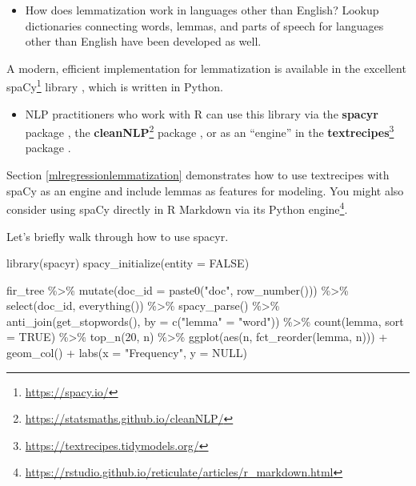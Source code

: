 \documentclass[
]{krantz}
\makeatletter
\newenvironment{Shaded}{\begin{snugshade}}{\end{snugshade}}
\newcommand{\AttributeTok}[1]{\textcolor[rgb]{0.77,0.63,0.00}{#1}}
\newcommand{\ConstantTok}[1]{\textcolor[rgb]{0.00,0.00,0.00}{#1}}
\newcommand{\DecValTok}[1]{\textcolor[rgb]{0.00,0.00,0.81}{#1}}
\newcommand{\FunctionTok}[1]{\textcolor[rgb]{0.00,0.00,0.00}{#1}}
\newcommand{\NormalTok}[1]{#1}
\newcommand{\OtherTok}[1]{\textcolor[rgb]{0.56,0.35,0.01}{#1}}
\newcommand{\SpecialCharTok}[1]{\textcolor[rgb]{0.00,0.00,0.00}{#1}}
\newcommand{\StringTok}[1]{\textcolor[rgb]{0.31,0.60,0.02}{#1}}
\DeclareRobustCommand{\href}[2]{#2\footnote{\url{#1}}}
\renewcommand{\href}[2]{#2\footnote{\url{#1}}}
\newenvironment{kframe}{%
\medskip{}
\setlength{\fboxsep}{.8em}
 \def\at@end@of@kframe{}%
 \ifinner\ifhmode%
  \def\at@end@of@kframe{\end{minipage}}%
  \begin{minipage}{\columnwidth}%
 \fi\fi%
 \def\FrameCommand##1{\hskip\@totalleftmargin \hskip-\fboxsep
 \colorbox{shadecolor}{##1}\hskip-\fboxsep
     \hskip-\linewidth \hskip-\@totalleftmargin \hskip\columnwidth}%
 \MakeFramed {\advance\hsize-\width
   \@totalleftmargin\z@ \linewidth\hsize
   \@setminipage}}%
 {\par\unskip\endMakeFramed%
 \at@end@of@kframe}
\renewenvironment{Shaded}{\begin{kframe}}{\end{kframe}}
\newenvironment{rmdblock}[1]
  {\begin{shaded*}
  \begin{itemize}[left = -1cm, labelsep = 1cm]
  \renewcommand{\labelitemi}{
    \raisebox{-.7\height}[0pt][0pt]{
      {\setkeys{Gin}{width=3em,keepaspectratio}\texttt{[image: images/\#1]}}
    }
  }
 
  \item
  }
  {
  \end{itemize}
  \end{shaded*}
  }
\newenvironment{rmdnote}
  {\begin{rmdblock}{note}}
  {\end{rmdblock}}
\newenvironment{rmdpackage}
  {\begin{rmdblock}{package}}
  {\end{rmdblock}}
\makeatother
\begin{document}
\begin{rmdnote}
How does lemmatization work in languages other than English? Lookup
dictionaries connecting words, lemmas, and parts of speech for languages
other than English have been developed as well.
\end{rmdnote}


A modern, efficient implementation for lemmatization is available in the excellent \href{https://spacy.io/}{spaCy} library \citep{spacy2}, which is written in Python.

\begin{rmdpackage}
NLP practitioners who work with R can use this library via the \textbf{spacyr} package \citep{Benoit19}, the \href{https://statsmaths.github.io/cleanNLP/}{\textbf{cleanNLP}} package \citep{Arnold17}, or as an ``engine'' in the \href{https://textrecipes.tidymodels.org/}{\textbf{textrecipes}} package \citep{textrecipes}.
\end{rmdpackage}

Section \ref{mlregressionlemmatization} demonstrates how to use textrecipes with spaCy as an engine and include lemmas as features for modeling. You might also consider using spaCy directly in R Markdown \href{https://rstudio.github.io/reticulate/articles/r_markdown.html}{via its Python engine}.

Let's briefly walk through how to use spacyr.

\begin{Shaded}
\begin{Highlighting}[]
\FunctionTok{library}\NormalTok{(spacyr)}
\FunctionTok{spacy\_initialize}\NormalTok{(}\AttributeTok{entity =} \ConstantTok{FALSE}\NormalTok{)}

\NormalTok{fir\_tree }\SpecialCharTok{\%\textgreater{}\%}
  \FunctionTok{mutate}\NormalTok{(}\AttributeTok{doc\_id =} \FunctionTok{paste0}\NormalTok{(}\StringTok{"doc"}\NormalTok{, }\FunctionTok{row\_number}\NormalTok{())) }\SpecialCharTok{\%\textgreater{}\%}
  \FunctionTok{select}\NormalTok{(doc\_id, }\FunctionTok{everything}\NormalTok{()) }\SpecialCharTok{\%\textgreater{}\%}
  \FunctionTok{spacy\_parse}\NormalTok{() }\SpecialCharTok{\%\textgreater{}\%}
  \FunctionTok{anti\_join}\NormalTok{(}\FunctionTok{get\_stopwords}\NormalTok{(), }\AttributeTok{by =} \FunctionTok{c}\NormalTok{(}\StringTok{"lemma"} \OtherTok{=} \StringTok{"word"}\NormalTok{)) }\SpecialCharTok{\%\textgreater{}\%}
  \FunctionTok{count}\NormalTok{(lemma, }\AttributeTok{sort =} \ConstantTok{TRUE}\NormalTok{) }\SpecialCharTok{\%\textgreater{}\%}
  \FunctionTok{top\_n}\NormalTok{(}\DecValTok{20}\NormalTok{, n) }\SpecialCharTok{\%\textgreater{}\%}
  \FunctionTok{ggplot}\NormalTok{(}\FunctionTok{aes}\NormalTok{(n, }\FunctionTok{fct\_reorder}\NormalTok{(lemma, n))) }\SpecialCharTok{+}
  \FunctionTok{geom\_col}\NormalTok{() }\SpecialCharTok{+}
  \FunctionTok{labs}\NormalTok{(}\AttributeTok{x =} \StringTok{"Frequency"}\NormalTok{, }\AttributeTok{y =} \ConstantTok{NULL}\NormalTok{)}
\end{Highlighting}
\end{Shaded}
\end{document}
